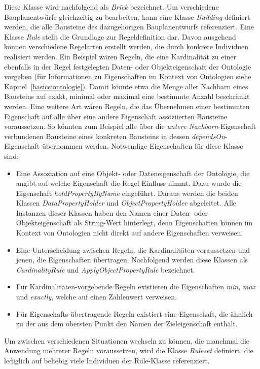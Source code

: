 Diese Klasse wird nachfolgend als \textit{Brick} bezeichnet.
Um verschiedene Bauplanentwürfe gleichzeitig zu bearbeiten, kann eine Klasse \textit{Building} definiert werden, die alle Bausteine des dazugehörigen Bauplanentwurfs referenziert.
Eine Klasse \textit{Rule} stellt die Grundlage zur Regeldefinition dar.
Davon ausgehend können verschiedene Regelarten erstellt werden, die durch konkrete Individuen realisiert werden.
Ein Beispiel wären Regeln, die eine Kardinalität zu einer ebenfalls in der Regel festgelegten Daten- oder Objekteigenschaft der Ontologie vorgeben (für Informationen zu Eigenschaften im Kontext von Ontologien siehe Kapitel~\ref{basics:ontologie}).
Damit könnte etwa die Menge aller Nachbarn eines Bausteins auf exakt, minimal oder maximal eine bestimmte Anzahl beschränkt werden.
Eine weitere Art wären Regeln, die das Übernehmen einer bestimmten Eigenschaft auf alle über eine andere Eigenschaft assoziierten Bausteine voraussetzen.
So könnten zum Beispiel alle über die \textit{untere Nachbarn}-Eigenschaft verbundenen Bausteine eines konkreten Bausteins in dessen \textit{dependsOn}-Eigenschaft übernommen werden.
Notwendige Eigenschaften für diese Klasse sind:
\begin{itemize}
  \item Eine Assoziation auf eine Objekt- oder Dateneigenschaft der Ontologie, die angibt auf welche Eigenschaft die Regel Einfluss nimmt. 
  Dazu wurde die Eigenschaft \textit{holdPropertyByName} eingeführt. 
  Daraus werden die beiden Klassen \textit{DataPropertyHolder} und \textit{ObjectPropertyHolder} abgeleitet. 
  Alle Instanzen dieser Klassen haben den Namen einer Daten- oder Objekteigenschaft als String-Wert hinterlegt, denn Eigenschaften können im Kontext von Ontologien nicht direkt auf andere Eigenschaften verweisen.
  \item Eine Unterscheidung zwischen Regeln, die Kardinalitäten voraussetzen und jenen, die Eigenschaften übertragen. 
  Nachfolgend werden diese Klassen als \textit{CardinalityRule} und \textit{ApplyObjectPropertyRule} bezeichnet.
  \item Für Kardinalitäten-vorgebende Regeln existieren die Eigenschaften \textit{min}, \textit{max} und \textit{exactly}, welche auf einen Zahlenwert verweisen.
  \item Für Eigenschafts-übertragende Regeln existiert eine Eigenschaft, die ähnlich zu der aus dem obersten Punkt den Namen der \glqq{}Zieleigenschaft\grqq{} enthält.
\end{itemize}
Um zwischen verschiedenen Situationen wechseln zu können, die manchmal die Anwendung mehrerer Regeln voraussetzen, wird die Klasse \textit{Ruleset} definiert, die lediglich auf beliebig viele Individuen der Rule-Klasse referenziert.

